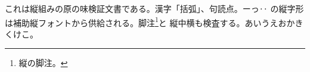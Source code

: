 \documentclass[pdflatex,tate,pdftex_fontset=haranoaji]{jlreq}
\begin{document}
これは縦組みの原の味検証文書である。漢字「括弧」、句読点。ーっ‥
の縦字形は補助縦フォントから供給される。脚注\footnote{縦の脚注。}と
縦中横も検査する。あいうえおかきくけこ。
\end{document}
